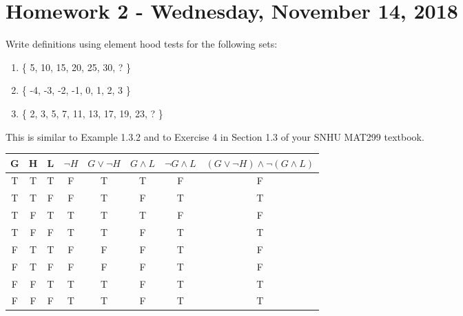 \chapter{Homework 2 - Wednesday, November 14, 2018}
\begin{prob}
Write definitions using element hood tests for the following sets: 
\begin{enumerate}
\item \{ 5, 10, 15, 20, 25, 30, ? \} \\
\item \{ -4, -3, -2, -1, 0, 1, 2, 3 \} \\
\item \{ 2, 3, 5, 7, 11, 13, 17, 19, 23, ? \} \\
\end{enumerate}
This is similar to Example 1.3.2 and to Exercise 4 in Section 1.3 of your SNHU MAT299 textbook.
\end{prob}
\begin{prob}
\end{prob}
\begin{center}
 \begin{tabular}{|c|c|c|c|c|c|c|c|} 
 \hline
 G & H & L & $\neg H$ & $G \vee \neg H$ & $G \wedge L$ & $\neg G \wedge L$ & $ (G \vee \neg H) \wedge \neg(G \wedge L) $ \\ 
 \hline
T & T & T & F & T & T & F & F\\
T & T & F & F & T & F & T & T\\
T & F & T & T & T & T & F & F\\
T & F & F & T & T & F & T & T\\
F & T & T & F & F & F & T & F\\
F & T & F & F & F & F & T & F\\
F & F & T & T & T & F & T & T\\
F & F & F & T & T & F & T & T\\
 \hline
\end{tabular}
\end{center}

















































